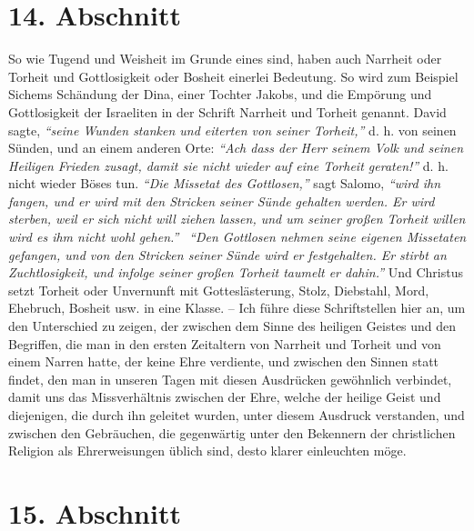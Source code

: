 \section{14. Abschnitt} \label{kap9_ab14}

So wie Tugend und Weisheit im Grunde eines sind, haben auch Narrheit oder
Torheit und Gottlosigkeit oder Bosheit einerlei Bedeutung. So wird zum Beispiel
Sichems Schändung der Dina, einer
Tochter Jakobs, und die Empörung und
Gottlosigkeit der Israeliten in der Schrift Narrheit
und Torheit
genannt.
David sagte,
\textit{"`seine Wunden stanken
und eiterten von seiner Torheit,"'}
d. h. von seinen Sünden,
und an einem anderen Orte:
\textit{"`Ach dass der Herr seinem Volk und seinen Heiligen
Frieden zusagt, damit sie nicht wieder auf eine Torheit
geraten!"'}
d. h. nicht wieder Böses tun.
\textit{"`Die Missetat des Gottlosen,"'}
sagt Salomo,
\textit{"`wird ihn fangen, und er wird mit den Stricken
seiner Sünde gehalten werden. Er wird sterben, weil er sich nicht
will ziehen lassen, und um seiner großen Torheit willen wird es ihm nicht wohl
gehen."'}~ \textit{"`Den Gottlosen nehmen seine eigenen Missetaten gefangen,
und von den Stricken seiner Sünde wird er festgehalten. Er stirbt an
Zuchtlosigkeit, und infolge seiner großen Torheit taumelt er dahin."'}
Und Christus setzt Torheit oder
Unvernunft mit Gotteslästerung, Stolz, Diebstahl, Mord, Ehebruch, Bosheit usw.
in eine Klasse. -- Ich führe diese Schriftstellen hier an, um den
Unterschied zu zeigen, der zwischen dem Sinne des heiligen Geistes und den
Begriffen, die man in den ersten Zeitaltern von Narrheit und Torheit und von
einem Narren hatte, der keine Ehre verdiente, und zwischen den Sinnen statt
findet, den man in unseren Tagen mit diesen Ausdrücken gewöhnlich verbindet,
damit uns das Missverhältnis zwischen der Ehre, welche der heilige Geist und
diejenigen, die durch ihn geleitet wurden, unter diesem Ausdruck verstanden,
und zwischen den Gebräuchen, die gegenwärtig unter den Bekennern der
christlichen Religion als Ehrerweisungen üblich sind, desto klarer einleuchten
möge.

\section{15. Abschnitt} \label{kap9_ab15}

